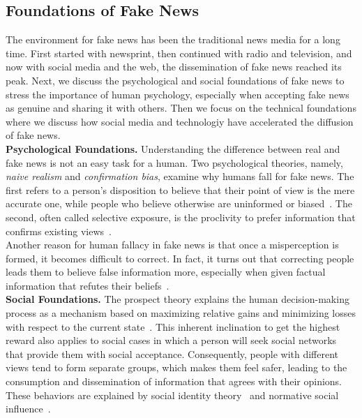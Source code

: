 \subsection{Foundations of Fake News}
\label{subsec:fakeNewsDetection_FoundationsOfFakeNews}
The environment for fake news has been the traditional news media for a long time. First started with newsprint,
then continued with radio and television, and now with social media and the web, the dissemination of fake news reached its peak. Next, we discuss the psychological and social foundations of fake news to stress the importance
of human psychology, especially when accepting fake news as genuine and sharing it with others. Then we focus on
the technical foundations where we discuss how social media and technologiy have accelerated the diffusion of fake news.\\
\textbf{Psychological Foundations.}  Understanding the difference between real and fake news is not an easy task
for a human. Two psychological theories, namely, \emph{naive realism} and \emph{confirmation bias}, examine why humans fall for fake news. The first refers to a person's disposition to believe that their point of view is the
mere accurate one, while people who believe otherwise are uninformed or biased~\parencite{NaiveRealism_Reed}.
The second, often called selective exposure, is the proclivity to prefer information that confirms existing views~\parencite{ConfirmationBias_Nickerson}.\\
Another reason for human fallacy in fake news is that once a misperception is formed, it becomes difficult to correct. In fact, it turns out that correcting people leads them to believe false information more, especially
when given factual information that refutes their beliefs~\parencite{WhenCorrectionsFail_Nyhan}.\\
\textbf{Social Foundations.}  The prospect theory explains the human decision-making process as a mechanism
based on maximizing relative gains and minimizing losses with respect to the current
state~\parencite{ProspectTheory_Kahneman, AdvancesInProspectTheory_Kahneman}. This inherent inclination to get the highest reward also applies to social cases in which a person will seek social networks that provide them with
social acceptance. Consequently,  people with different views tend to form separate groups, which makes them feel safer, leading to the consumption and dissemination of information that agrees with their opinions. These behaviors are explained by social identity theory~\parencite{SocialIdentityTheory_Ashforth} and normative social influence~\parencite{NormativeSocialInfluence_Asch}.\\
